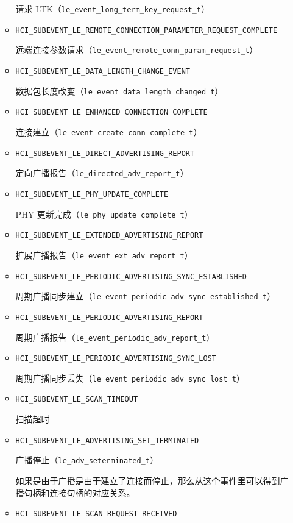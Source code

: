 \documentclass[
  12pt,
]{book}
\begin{document}
\begin{enumerate}
\begin{itemize}
    请求 LTK（\texttt{le\_event\_long\_term\_key\_request\_t}）
  \item
    \texttt{HCI\_SUBEVENT\_LE\_REMOTE\_CONNECTION\_PARAMETER\_REQUEST\_COMPLETE}

    远端连接参数请求（\texttt{le\_event\_remote\_conn\_param\_request\_t}）
  \item
    \texttt{HCI\_SUBEVENT\_LE\_DATA\_LENGTH\_CHANGE\_EVENT}

    数据包长度改变（\texttt{le\_event\_data\_length\_changed\_t}）
  \item
    \texttt{HCI\_SUBEVENT\_LE\_ENHANCED\_CONNECTION\_COMPLETE}

    连接建立（\texttt{le\_event\_create\_conn\_complete\_t}）
  \item
    \texttt{HCI\_SUBEVENT\_LE\_DIRECT\_ADVERTISING\_REPORT}

    定向广播报告（\texttt{le\_directed\_adv\_report\_t}）
  \item
    \texttt{HCI\_SUBEVENT\_LE\_PHY\_UPDATE\_COMPLETE}

    PHY 更新完成（\texttt{le\_phy\_update\_complete\_t}）
  \item
    \texttt{HCI\_SUBEVENT\_LE\_EXTENDED\_ADVERTISING\_REPORT}

    扩展广播报告（\texttt{le\_event\_ext\_adv\_report\_t}）
  \item
    \texttt{HCI\_SUBEVENT\_LE\_PERIODIC\_ADVERTISING\_SYNC\_ESTABLISHED}

    周期广播同步建立（\texttt{le\_event\_periodic\_adv\_sync\_established\_t}）
  \item
    \texttt{HCI\_SUBEVENT\_LE\_PERIODIC\_ADVERTISING\_REPORT}

    周期广播报告（\texttt{le\_event\_periodic\_adv\_report\_t}）
  \item
    \texttt{HCI\_SUBEVENT\_LE\_PERIODIC\_ADVERTISING\_SYNC\_LOST}

    周期广播同步丢失（\texttt{le\_event\_periodic\_adv\_sync\_lost\_t}）
  \item
    \texttt{HCI\_SUBEVENT\_LE\_SCAN\_TIMEOUT}

    扫描超时
  \item
    \texttt{HCI\_SUBEVENT\_LE\_ADVERTISING\_SET\_TERMINATED}

    广播停止（\texttt{le\_adv\_seterminated\_t}）

    如果是由于广播是由于建立了连接而停止，那么从这个事件里可以得到广播句柄和连接句柄的对应关系。
  \item
    \texttt{HCI\_SUBEVENT\_LE\_SCAN\_REQUEST\_RECEIVED}


\end{itemize}
\end{enumerate}
\end{document}
